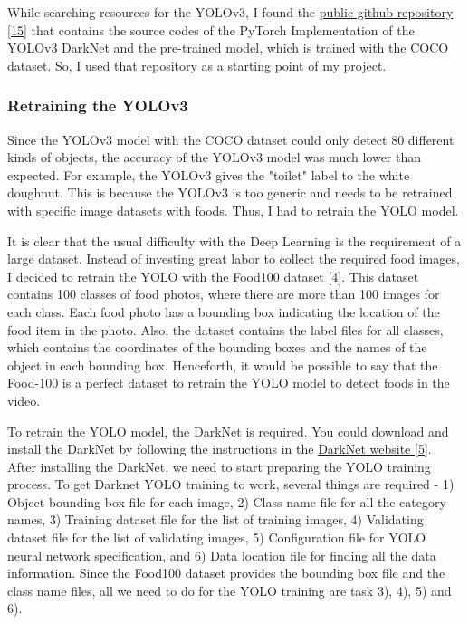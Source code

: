 \documentclass{article}
\begin{document}
While searching resources for the YOLOv3, I found the \hyperlink{ref15}{public github repository [15]} that contains the source codes of the PyTorch Implementation of the YOLOv3 DarkNet and the pre-trained model, which is trained with the COCO dataset. So, I used that repository as a starting point of my project.

\subsubsection{Retraining the YOLOv3}

Since the YOLOv3 model with the COCO dataset could only detect 80 different kinds of objects, the accuracy of the YOLOv3 model was much lower than expected. For example, the YOLOv3 gives the "toilet" label to the white doughnut. This is because the YOLOv3 is too generic and needs to be retrained with specific image datasets with foods. Thus, I had to retrain the YOLO model.

It is clear that the usual difficulty with the Deep Learning is the requirement of a large dataset. Instead of investing great labor to collect the required food images, I decided to retrain the YOLO with the \hyperlink{ref4}{Food100 dataset [4]}. This dataset contains 100 classes of food photos, where there are more than 100 images for each class. Each food photo has a bounding box indicating the location of the food item in the photo. Also, the dataset contains the label files for all classes, which contains the coordinates of the bounding boxes and the names of the object in each bounding box. Henceforth, it would be possible to say that the Food-100 is a perfect dataset to retrain the YOLO model to detect foods in the video.

To retrain the YOLO model, the DarkNet is required. You could download and install the DarkNet by following the instructions in the \hyperlink{ref5}{DarkNet website [5]}. After installing the DarkNet, we need to start preparing the YOLO training process. To get Darknet YOLO training to work, several things are required - 1) Object bounding box file for each image, 2) Class name file for all the category names, 3) Training dataset file for the list of training images, 4) Validating dataset file for the list of validating images, 5) Configuration file for YOLO neural network specification, and 6) Data location file for finding all the data information. Since the Food100 dataset provides the bounding box file and the class name files, all we need to do for the YOLO training are task 3), 4), 5) and 6).
\end{document}
